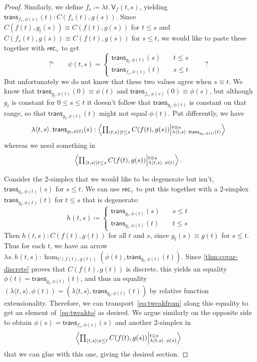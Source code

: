 \documentclass[12pt]{amsart}
\theoremstyle{plain}
\theoremstyle{definition}
\theoremstyle{remark}
\numberwithin{equation}{section}
\newcommand{\exten}[4]{\left\langle\mathchoice{\textstyle\prod_{#1}}{\textstyle\prod_{#1}}{\scriptstyle\prod_{#1}}{\scriptscriptstyle\prod_{#1}} #2 \middle|^{#3}_{#4}\right\rangle}
\newcommand{\jdeq}{\equiv}
\newcommand{\defeq}{\coloneqq}
\newcommand{\pair}[1]{\langle #1\rangle}
\newcommand{\rec}{\mathsf{rec}}
\newcommand{\connmax}[1]{\mathsf{V}_{#1}}
\newcommand{\lam}[1]{\lambda #1.\,}
\newcommand{\istrans}[2]{\mathsf{trans}_{#1,#2}}
\newcommand{\maybe}[1]{\text{?`}\qquad #1 \qquad \text{?}}
\begin{document}
\begin{proof}
  Similarly, we define $f_s \defeq \lam{t} \connmax f(t,s)$, yielding $\istrans{f_s}{\phi(s)}(t): C(f_s(t),g(s))$.
Since $C(f(t),g_t(s)) \jdeq C(f(t),g(s))$ for $t\le s$ and $C(f_s(t),g(s)) \jdeq C(f(t),g(s))$ for $s\le t$, we would like to paste these together with $\rec_\lor$ to get
  \[ \maybe{\psi(t,s) =
  \begin{cases}
    \istrans{g_t}{\phi(t)}(s) &\quad t\le s\\
    \istrans{f_s}{\phi(s)}(t) &\quad s\le t
  \end{cases}}
  \]
  But unfortunately we do not know that these two values agree when $s\jdeq t$.
  We know that $\istrans{g_t}{\phi(t)}(0) \jdeq \phi(t)$ and $\istrans{f_s}{\phi(s)}(0)\jdeq \phi(s)$, but although $g_t$ is constant for $0\le s\le t$ it doesn't follow that $\istrans{g_t}{\phi(t)}$ is constant on that range, so that $\istrans{g_t}{\phi(t)}(t)$ might not equal $\phi(t)$.
  Put differently, we have
  \begin{equation}
    \lam{\pair{t,s}} \istrans{g_t}{\phi(t)}(s) : \exten{\pair{t,s}\mid t\le s}{C(f(t),g(s))}{t\jdeq s}{\lam{\pair{t,s}}\istrans{g_t}{\phi(t)}(t)}\label{eq:tweakfrom}
  \end{equation}
  whereas we need something in
  \begin{equation}
    \exten{\pair{t,s}\mid t\le s}{C(f(t),g(s))}{t\jdeq s}{\lam{\pair{t,s}}\phi(t)}.\label{eq:tweakto}
  \end{equation}

  Consider the 2-simplex that we would like to be degenerate but isn't, $\istrans{g_t}{\phi(t)}(s)$ for $s\le t$.
  We can use $\rec_\lor$ to put this together with a 2-simplex $\istrans{g_t}{\phi(t)}(t)$ for $t \le s$ that is degenerate:
  \[
  h(t,s) \defeq
  \begin{cases}
    \istrans{g_t}{\phi(t)}(s)&\quad s\le t\\
    \istrans{g_t}{\phi(t)}(t) &\quad t\le s
  \end{cases}
  \]
  Then $h(t,s) : C(f(t),g(t))$ for all $t$ and $s$, since $g_t(s)\jdeq g(t)$ for $s\le t$.
  Thus for each $t$, we have an arrow $\lam{s} h(t,s) : \hom_{C(f(t),g(t))}(\phi(t),\istrans{g_t}{\phi(t)}(t))$.
  Since \cref{thm:covar-discrete} proves that $C(f(t),g(t))$ is discrete, this yields an equality $\phi(t) = \istrans{g_t}{\phi(t)}(t)$, and thus  an equality $(\lam{\pair{t,s}}\phi(t)) = (\lam{\pair{t,s}}\istrans{g_t}{\phi(t)}(t))$ by relative function extensionality.
  Therefore, we can transport~\eqref{eq:tweakfrom} along this equality to get an element of~\eqref{eq:tweakto} as desired.
  We argue similarly on the opposite side to obtain $\phi(s)= \istrans{f_s}{\phi(s)}(s)$ and another 2-simplex in
  \[
      \exten{\pair{t,s}\mid s\le t}{C(f(t),g(s))}{t\jdeq s}{\lam{\pair{t,s}}\phi(s)}
      \] that we can glue with this one, giving the desired section.
\end{proof}
\end{document}
